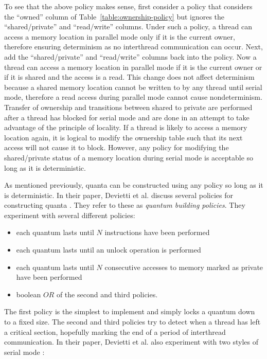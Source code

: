 To see that the above policy makes sense, first consider a policy that
considers the ``owned'' column of Table~\ref{table:ownership-policy}
but ignores the ``shared/private'' and ``read/write'' columns.  Under
such a policy, a thread can access a memory location in parallel mode
only if it is the current owner, therefore ensuring determinism as no
interthread communication can occur.  Next, add the ``shared/private''
and ``read/write'' columns back into the policy.  Now a thread can
access a memory location in parallel mode if it is the current owner
or if it is shared and the access is a read.  This change does not
affect determinism because a shared memory location cannot be written
to by any thread until serial mode, therefore a read access during
parallel mode cannot cause nondeterminism.  Transfer of ownership and
transitions between shared to private are performed after a thread has
blocked for serial mode and are done in an attempt to take advantage
of the principle of locality.  If a thread is likely to access a
memory location again, it is logical to modify the ownership table
such that its next access will not cause it to block.  However, any
policy for modifying the shared/private status of a memory location
during serial mode is acceptable so long as it is deterministic.

As mentioned previously, quanta can be constructed using any policy so
long as it is deterministic.  In their paper, Devietti et al. discuss
several policies for constructing quanta \cite{dmp}.  They refer to
these as \emph{quantum building policies}.  They experiment with
several different policies:

\begin{itemize}
\item each quantum lasts until $N$ instructions have been performed

\item each quantum lasts until an unlock operation is performed

\item each quantum lasts until $N$ consecutive accesses to memory
  marked as private have been performed

\item boolean $OR$ of the second and third policies.
\end{itemize}

The first policy is the simplest to implement and simply locks a
quantum down to a fixed size.  The second and third policies try to
detect when a thread has left a critical section, hopefully marking
the end of a period of interthread communication.  In their paper,
Devietti et al. also experiment with two styles of serial mode
\cite{dmp}:

